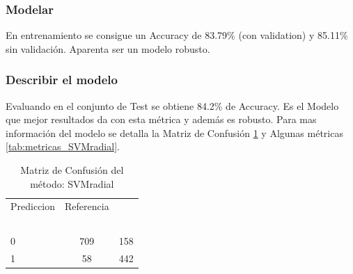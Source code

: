 \subsubsection{Modelar}

En entrenamiento se consigue un Accuracy de 83.79\% (con validation) y
85.11\% sin validación. Aparenta ser un modelo robusto.


\subsubsection{Describir el modelo}

Evaluando en el conjunto de Test se obtiene 84.2\% de Accuracy. Es el Modelo que mejor resultados da con esta métrica y además es robusto. Para mas información del modelo se detalla la Matriz de Confusión \ref{tab:MatrizConf_SVMradial} y Algunas métricas \ref{tab:metricas_SVMradial}.

\begin{table}[!h]
	
	\caption{\label{tab:MatrizConf_SVMradial}Matriz de Confusión del método: SVMradial }
	\centering
	\begin{tabular}[t]{lcc}
		\toprule
		\multicolumn{1}{c}{Prediccion} & \multicolumn{1}{c}{Referencia} & \multicolumn{1}{c}{ } \\
		\cmidrule(l{3pt}r{3pt}){1-1} \cmidrule(l{3pt}r{3pt}){2-2}
		\rowcolor{black}  \multicolumn{1}{c}{\textcolor{white}{\textbf{ }}} & \multicolumn{1}{c}{\textcolor{white}{\textbf{0}}} & \multicolumn{1}{c}{\textcolor{white}{\textbf{1}}}\\
		\midrule
		\rowcolor{gray!6}  0 & 709 & 158\\
		1 & 58 & 442\\
		\bottomrule
	\end{tabular}
\end{table}

